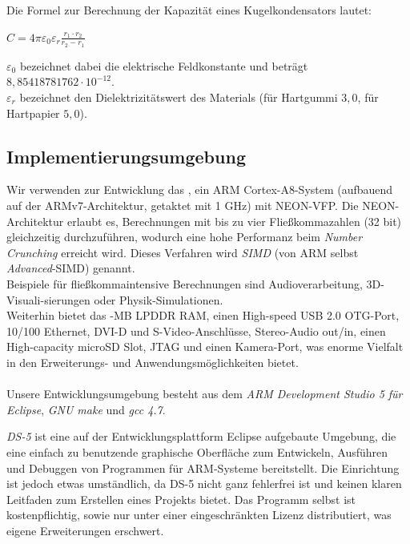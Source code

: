 \documentclass[11pt]{scrartcl}
\begin{document}
Die Formel zur Berechnung der Kapazität eines Kugelkondensators lautet:

\begin{center} \begin{LARGE}
$ C= 4 \pi \varepsilon_{0} \varepsilon_{r} \frac{r_{1} \cdot r_{2}} {r_{2} - r_{1}} $
\end{LARGE} \end{center}
$ \varepsilon_{0} $ bezeichnet dabei die elektrische Feldkonstante und beträgt $8,85418781762 \cdot 10^{-12}$.\\
$ \varepsilon_{r} $ bezeichnet den Dielektrizitätswert des Materials (für Hartgummi $3,0$, für Hartpapier $5,0$).

\subsection{Implementierungsumgebung}
Wir verwenden zur Entwicklung das \board, ein ARM Cortex-A8-System (aufbauend auf der ARMv7-Architektur, getaktet mit 1 GHz) mit NEON-VFP. Die NEON-Architektur erlaubt es, Berechnungen mit bis zu vier Fließkommazahlen (32 bit) gleichzeitig durchzuführen, wodurch eine hohe Performanz beim \emph{Number Crunching} erreicht wird. Dieses Verfahren wird \emph{SIMD} (von ARM selbst \emph{Advanced}-SIMD) genannt.\\
Beispiele für fließkommaintensive Berechnungen sind Audioverarbeitung, 3D-Visuali-sierungen oder Physik-Simulationen.\\
Weiterhin bietet das -MB LPDDR RAM, einen High-speed USB 2.0 OTG-Port, 10/100 Ethernet, DVI-D und S-Video-Anschlüsse, Stereo-Audio out/in, einen High-capacity microSD Slot, JTAG und einen Kamera-Port, was enorme Vielfalt in den Erweiterungs- und Anwendungsmöglichkeiten bietet.
\\ \\
Unsere Entwicklungsumgebung besteht aus dem \emph{ARM Development Studio 5 für Eclipse}, \emph{GNU make} und \emph{gcc 4.7}.

\emph{DS-5} ist eine auf der Entwicklungsplattform Eclipse aufgebaute Umgebung, die eine einfach zu benutzende graphische Oberfläche zum Entwickeln, Ausführen und Debuggen von Programmen für ARM-Systeme bereitstellt. Die Einrichtung ist jedoch etwas umständlich, da DS-5 nicht ganz fehlerfrei ist und keinen klaren Leitfaden zum Erstellen eines Projekts bietet. Das Programm selbst ist kostenpflichtig, sowie nur unter einer eingeschränkten Lizenz distributiert, was eigene Erweiterungen erschwert.
\end{document}
